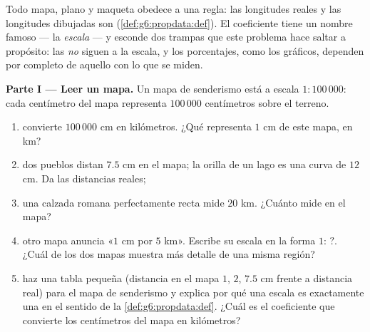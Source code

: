 \begin{problem}
\label{pb:g6:propdata:1}
Todo mapa, plano y maqueta obedece a una regla: las longitudes reales y las
longitudes dibujadas son \emph{}
(\cref{def:g6:propdata:def}). El coeficiente tiene un nombre famoso
--- la \emph{escala} --- y esconde dos trampas que
este problema hace saltar a propósito: las  \emph{no} siguen a la
escala, y los porcentajes, como los gráficos, dependen por completo de aquello
con lo que se miden.

\medskip
\noindent\textbf{Parte I --- Leer un mapa.}
Un mapa de senderismo está a escala $1:100\,000$: cada centímetro del mapa
representa $100\,000$ centímetros sobre el terreno.
\begin{enumerate}
  \item convierte $100\,000$ cm en kilómetros. ¿Qué representa $1$ cm
        de este mapa, en km?
  \item dos pueblos distan $7.5$ cm en el mapa; la orilla de
        un lago es una curva de $12$ cm. Da las distancias reales;
  \item una calzada romana perfectamente recta mide $20$ km. ¿Cuánto mide
        en el mapa?
  \item otro mapa anuncia «$1$ cm por $5$ km». Escribe su
        escala en la forma $1: \,?$. ¿Cuál de los dos mapas muestra
        más detalle de una misma región?
  \item haz una tabla pequeña (distancia en el mapa $1$, $2$, $7.5$ cm
        frente a distancia real) para el mapa de senderismo y explica
        por qué una escala es exactamente una  en el sentido de la
        \cref{def:g6:propdata:def}. ¿Cuál es el coeficiente que
        convierte los centímetros del mapa en kilómetros?
\end{enumerate}


\end{problem}
